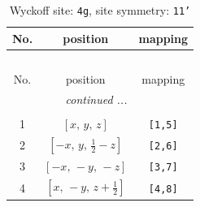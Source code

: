 \documentclass[fleqn,8pt]{jsarticle}
\begin{document}
\begin{longtable}{ccc}
\caption{Wyckoff site: {\tt 4g}, site symmetry: {\tt 11'}}
 \\
 \hline \hline
No. & position & mapping \\ \hline \endfirsthead

\multicolumn{2}{l}{\tablename\ \thetable{}} \\
 \hline \hline
No. & position & mapping \\ \hline \endhead

 \hline \hline
\multicolumn{2}{r}{\footnotesize\it continued ...} \\ \endfoot

 \hline \hline
\multicolumn{2}{r}{} \\ \endlastfoot

1 & $\left[ x,\, y,\, z \right]$ & {\tt [1,5]} \\ \hline
2 & $\left[ - x,\, y,\, \frac{1}{2} - z \right]$ & {\tt [2,6]} \\ \hline
3 & $\left[ - x,\, - y,\, - z \right]$ & {\tt [3,7]} \\ \hline
4 & $\left[ x,\, - y,\, z + \frac{1}{2} \right]$ & {\tt [4,8]} \\
\end{longtable}
\end{document}
